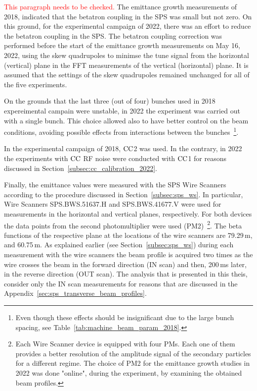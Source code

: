\textcolor{red}{This paragraph needs to be checked.}
The emittance growth measurements of 2018, indicated that the betatron coupling in the SPS was small but not zero. On this ground, for the experimental campaign of 2022, there was an effort to reduce the betatron coupling in the SPS. The betatron coupling correction was performed before the start of the emittance growth measurements on May 16, 2022, using the skew quadrupoles to minimse the tune signal from the horizontal (vertical) plane in the FFT measurements of the vertical (horizontal) plane. It is assumed that the settings of the skew quadrupoles remained unchanged for all of the five experiments.

On the grounds that the last three (out of four) bunches used in 2018 expereimental campain were unstable, in 2022 the experiment was carried out with a single bunch. This choice allowed also to have better control on the beam conditions, avoiding possible effects from interactions between the bunches~\footnote{Even though these effects should be insignificant due to the large bunch spacing, see Table~\ref{tab:machine_beam_param_2018}.}.

In the experimental campaign of 2018, ${\mathrm{CC}}$2 was used. In the contrary, in 2022 the experiments with  ${\mathrm{CC}}$ RF noise were conducted with ${\mathrm{CC}}$1 for reasons discussed in Section~\ref{subsec:cc_calibration_2022}.

Finally, the emittance values were measured with the SPS Wire Scanners according to the procedure discussed in Section~\ref{subsec:sps_ws}. In particular, Wire Scanners SPS.BWS.51637.H and SPS.BWS.41677.V were used for measurements in the horizontal and vertical planes, respectively. For both devices the data points from the second photomultiplier were used (PM2)~\footnote{Each Wire Scanner device is equipped with four PMs. Each one of them provides a better resolution of the amplitude signal of the secondary particles for a different regime. The choice of PM2 for the emittance growth studies in 2022 was done "online", during the experiment, by examining the obtained beam profiles.}. The beta functions of the respective plane at the locations of the wire scanners are 79.29\,m, and  60.75\,m. 
As explained earlier (see Section~\ref{subsec:sps_ws}) during each measurement with the wire scanners the beam profile is acquired two times as the wire crosses the beam in the forward direction (IN scan) and then, 200\,ms later, in the reverse direction (OUT scan). The analysis that is presented in this theis, consider only the IN scan measurements for reasons that are discussed in the Appendix~\ref{sec:sps_transverse_beam_profiles}.



